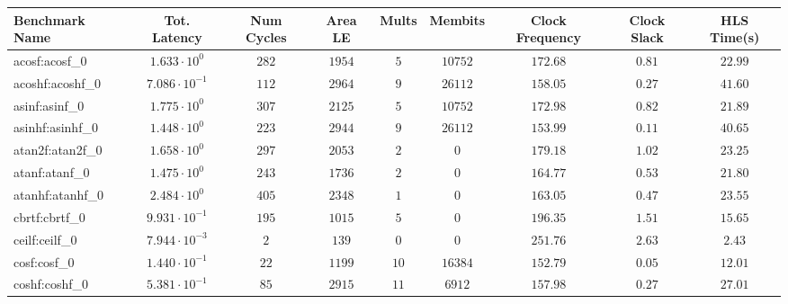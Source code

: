\begin{tabular}{|l|c|c|c|c|c|c|c|c|}
\hline
Benchmark Name               & Tot. Latency            & Num Cycles & Area LE   & Mults   & Membits    & Clock Frequency & Clock Slack & HLS Time(s) \\
\hline
acosf:acosf\_0               & $ 1.633 \cdot 10^{0}  $ & $ 282    $ & $ 1954  $ & $ 5   $ & $ 10752  $ & $ 172.68      $ & $ 0.81    $ & $ 22.99   $ \\
acoshf:acoshf\_0             & $ 7.086 \cdot 10^{-1} $ & $ 112    $ & $ 2964  $ & $ 9   $ & $ 26112  $ & $ 158.05      $ & $ 0.27    $ & $ 41.60   $ \\
asinf:asinf\_0               & $ 1.775 \cdot 10^{0}  $ & $ 307    $ & $ 2125  $ & $ 5   $ & $ 10752  $ & $ 172.98      $ & $ 0.82    $ & $ 21.89   $ \\
asinhf:asinhf\_0             & $ 1.448 \cdot 10^{0}  $ & $ 223    $ & $ 2944  $ & $ 9   $ & $ 26112  $ & $ 153.99      $ & $ 0.11    $ & $ 40.65   $ \\
atan2f:atan2f\_0             & $ 1.658 \cdot 10^{0}  $ & $ 297    $ & $ 2053  $ & $ 2   $ & $ 0      $ & $ 179.18      $ & $ 1.02    $ & $ 23.25   $ \\
atanf:atanf\_0               & $ 1.475 \cdot 10^{0}  $ & $ 243    $ & $ 1736  $ & $ 2   $ & $ 0      $ & $ 164.77      $ & $ 0.53    $ & $ 21.80   $ \\
atanhf:atanhf\_0             & $ 2.484 \cdot 10^{0}  $ & $ 405    $ & $ 2348  $ & $ 1   $ & $ 0      $ & $ 163.05      $ & $ 0.47    $ & $ 23.55   $ \\
cbrtf:cbrtf\_0               & $ 9.931 \cdot 10^{-1} $ & $ 195    $ & $ 1015  $ & $ 5   $ & $ 0      $ & $ 196.35      $ & $ 1.51    $ & $ 15.65   $ \\
ceilf:ceilf\_0               & $ 7.944 \cdot 10^{-3} $ & $ 2      $ & $ 139   $ & $ 0   $ & $ 0      $ & $ 251.76      $ & $ 2.63    $ & $ 2.43    $ \\
cosf:cosf\_0                 & $ 1.440 \cdot 10^{-1} $ & $ 22     $ & $ 1199  $ & $ 10  $ & $ 16384  $ & $ 152.79      $ & $ 0.05    $ & $ 12.01   $ \\
coshf:coshf\_0               & $ 5.381 \cdot 10^{-1} $ & $ 85     $ & $ 2915  $ & $ 11  $ & $ 6912   $ & $ 157.98      $ & $ 0.27    $ & $ 27.01   $ \\

\end{tabular}
